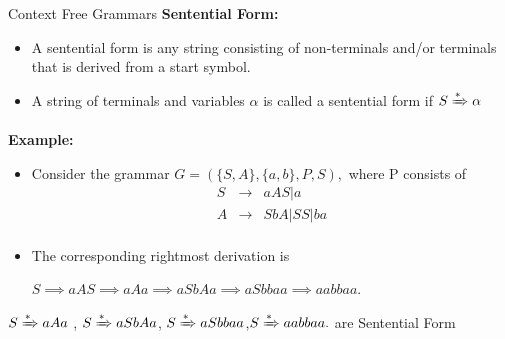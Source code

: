 \documentclass{beamer}
\begin{document}
\begin{frame}{Context Free Grammars}
	\textbf{Sentential Form:}
	\begin{itemize}
		\item A sentential form is any string consisting of non-terminals and/or terminals that is derived from a start symbol. 
		\item A string of terminals and variables $\alpha$ is called a sentential form if $S\xRightarrow{*}\alpha$
	\end{itemize}
\textbf{Example:}
\begin{itemize}
	\item Consider the grammar $G = (\{S, A\}, \{a, b\}, P, S),$ where P consists of 
	\begin{eqnarray*}
		S& \rightarrow &aAS | a \\
		A& \rightarrow &SbA|SS|ba\\
	\end{eqnarray*}
	\item The corresponding rightmost derivation is 

		$S \implies aAS \implies aAa \implies aSbAa \implies aSbbaa \implies aabbaa.$

\end{itemize}

$	S \xRightarrow{*} aAa$ ,	$S  \xRightarrow{*} aSbAa$,
$S\xRightarrow{*} aSbbaa$,$S\xRightarrow{*}aabbaa.$ are Sentential Form

\end{frame}
\end{document}
